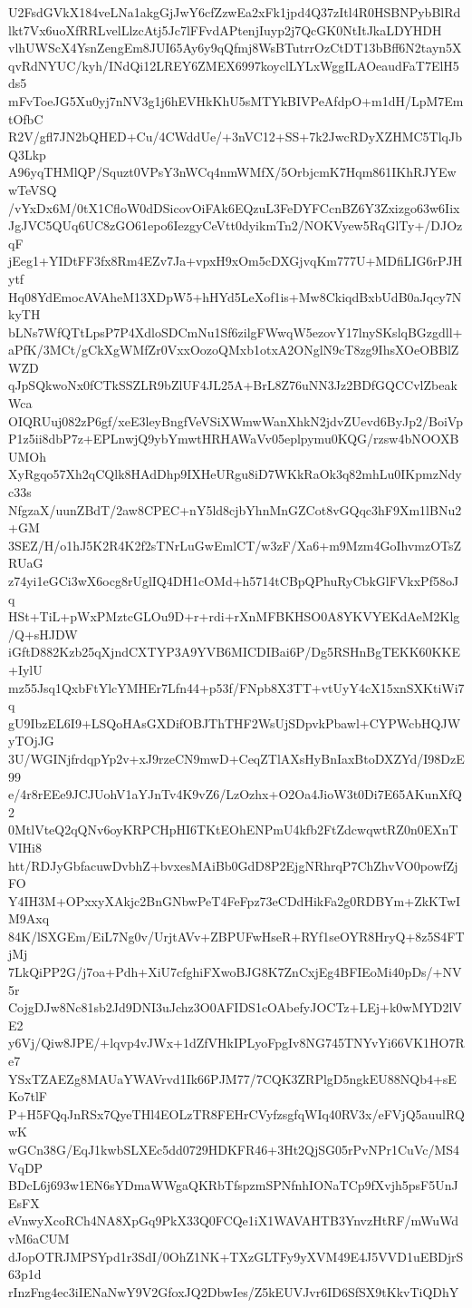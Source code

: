 U2FsdGVkX184veLNa1akgGjJwY6cfZzwEa2xFk1jpd4Q37zItl4R0HSBNPybBlRd
lkt7Vx6uoXfRRLvelLlzcAtj5Jc7lFFvdAPtenjIuyp2j7QcGK0NtItJkaLDYHDH
vlhUWScX4YsnZengEm8JUI65Ay6y9qQfmj8WsBTutrrOzCtDT13bBff6N2tayn5X
qvRdNYUC/kyh/INdQi12LREY6ZMEX6997koyclLYLxWggILAOeaudFaT7ElH5ds5
mFvToeJG5Xu0yj7nNV3g1j6hEVHkKhU5sMTYkBIVPeAfdpO+m1dH/LpM7EmtOfbC
R2V/gfl7JN2bQHED+Cu/4CWddUe/+3nVC12+SS+7k2JwcRDyXZHMC5TlqJbQ3Lkp
A96yqTHMlQP/Squzt0VPsY3nWCq4nmWMfX/5OrbjcmK7Hqm861IKhRJYEwwTeVSQ
/vYxDx6M/0tX1CfloW0dDSicovOiFAk6EQzuL3FeDYFCcnBZ6Y3Zxizgo63w6Iix
JgJVC5QUq6UC8zGO61epo6IezgyCeVtt0dyikmTn2/NOKVyew5RqGlTy+/DJOzqF
jEeg1+YIDtFF3fx8Rm4EZv7Ja+vpxH9xOm5cDXGjvqKm777U+MDfiLIG6rPJHytf
Hq08YdEmocAVAheM13XDpW5+hHYd5LeXof1is+Mw8CkiqdBxbUdB0aJqcy7NkyTH
bLNs7WfQTtLpsP7P4XdloSDCmNu1Sf6zilgFWwqW5ezovY17lnySKslqBGzgdll+
aPfK/3MCt/gCkXgWMfZr0VxxOozoQMxb1otxA2ONglN9cT8zg9IhsXOeOBBlZWZD
qJpSQkwoNx0fCTkSSZLR9bZlUF4JL25A+BrL8Z76uNN3Jz2BDfGQCCvlZbeakWca
OIQRUuj082zP6gf/xeE3leyBngfVeVSiXWmwWanXhkN2jdvZUevd6ByJp2/BoiVp
P1z5ii8dbP7z+EPLnwjQ9ybYmwtHRHAWaVv05eplpymu0KQG/rzsw4bNOOXBUMOh
XyRgqo57Xh2qCQlk8HAdDhp9IXHeURgu8iD7WKkRaOk3q82mhLu0IKpmzNdyc33s
NfgzaX/uunZBdT/2aw8CPEC+nY5ld8cjbYhnMnGZCot8vGQqc3hF9Xm1lBNu2+GM
3SEZ/H/o1hJ5K2R4K2f2sTNrLuGwEmlCT/w3zF/Xa6+m9Mzm4GoIhvmzOTsZRUaG
z74yi1eGCi3wX6ocg8rUglIQ4DH1cOMd+h5714tCBpQPhuRyCbkGlFVkxPf58oJq
HSt+TiL+pWxPMztcGLOu9D+r+rdi+rXnMFBKHSO0A8YKVYEKdAeM2Klg/Q+sHJDW
iGftD882Kzb25qXjndCXTYP3A9YVB6MICDIBai6P/Dg5RSHnBgTEKK60KKE+IylU
mz55Jsq1QxbFtYlcYMHEr7Lfn44+p53f/FNpb8X3TT+vtUyY4cX15xnSXKtiWi7q
gU9IbzEL6I9+LSQoHAsGXDifOBJThTHF2WsUjSDpvkPbawl+CYPWcbHQJWyTOjJG
3U/WGINjfrdqpYp2v+xJ9rzeCN9mwD+CeqZTlAXsHyBnIaxBtoDXZYd/I98DzE99
e/4r8rEEe9JCJUohV1aYJnTv4K9vZ6/LzOzhx+O2Oa4JioW3t0Di7E65AKunXfQ2
0MtlVteQ2qQNv6oyKRPCHpHI6TKtEOhENPmU4kfb2FtZdcwqwtRZ0n0EXnTVIHi8
htt/RDJyGbfacuwDvbhZ+bvxesMAiBb0GdD8P2EjgNRhrqP7ChZhvVO0powfZjFO
Y4IH3M+OPxxyXAkjc2BnGNbwPeT4FeFpz73eCDdHikFa2g0RDBYm+ZkKTwIM9Axq
84K/lSXGEm/EiL7Ng0v/UrjtAVv+ZBPUFwHseR+RYf1seOYR8HryQ+8z5S4FTjMj
7LkQiPP2G/j7oa+Pdh+XiU7cfghiFXwoBJG8K7ZnCxjEg4BFIEoMi40pDs/+NV5r
CojgDJw8Nc81sb2Jd9DNI3uJchz3O0AFIDS1cOAbefyJOCTz+LEj+k0wMYD2lVE2
y6Vj/Qiw8JPE/+lqvp4vJWx+1dZfVHkIPLyoFpgIv8NG745TNYvYi66VK1HO7Re7
YSxTZAEZg8MAUaYWAVrvd1Ik66PJM77/7CQK3ZRPlgD5ngkEU88NQb4+sEKo7tlF
P+H5FQqJnRSx7QyeTHl4EOLzTR8FEHrCVyfzsgfqWIq40RV3x/eFVjQ5auulRQwK
wGCn38G/EqJ1kwbSLXEc5dd0729HDKFR46+3Ht2QjSG05rPvNPr1CuVc/MS4VqDP
BDcL6j693w1EN6sYDmaWWgaQKRbTfspzmSPNfnhIONaTCp9fXvjh5psF5UnJEsFX
eVnwyXcoRCh4NA8XpGq9PkX33Q0FCQe1iX1WAVAHTB3YnvzHtRF/mWuWdvM6aCUM
dJopOTRJMPSYpd1r3SdI/0OhZ1NK+TXzGLTFy9yXVM49E4J5VVD1uEBDjrS63p1d
rInzFng4ec3iIENaNwY9V2GfoxJQ2DbwIes/Z5kEUVJvr6ID6SfSX9tKkvTiQDhY
